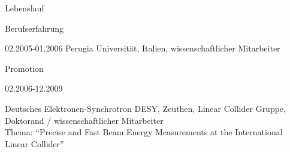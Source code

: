 \documentclass[11pt,a4paper]{scrartcl}
\begin{document}
\begin{cv}{Lebenslauf}
\begin{cvlist}{Berufserfahrung}
\vspace{\baselineskip}

\item[02.2005-01.2006] Perugia
Universit\"at, Italien, wissenschaftlicher Mitarbeiter \\

% 

\end{cvlist}

\begin{cvlist}{Promotion}
\item[02.2006-12.2009]

Deutsches Elektronen-Synchrotron DESY, Zeuthen, Linear Collider
Gruppe, Doktorand / wissenschaftlicher Mitarbeiter\\ Thema:
"`Precise and Fast Beam Energy Measurements at the International
Linear Collider"'

% 
%   
%   
%   


\end{cvlist}
\end{cv}
\end{document}
